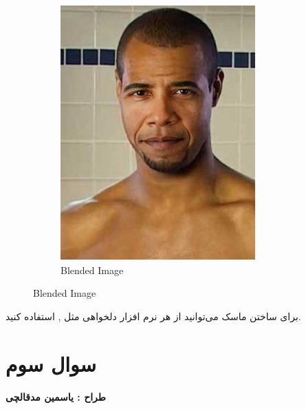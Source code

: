 \documentclass[a4paper]{article}
\begin{document}
{\begin{figure}[H]
\begin{subfigure}[b]{0.2\linewidth}
			\includegraphics[width=\linewidth]{images/Picture5.png}
			\caption*{Blended Image}
		\end{subfigure}
	\end{figure}
}
برای ساختن ماسک می‌توانید از هر نرم افزار دلخواهی مثل 
,
استفاده کنید.
\section*{سوال سوم}
\textbf{طراح :‌ یاسمین مدقالچی }
\vspace{0.3cm}
\end{document}

